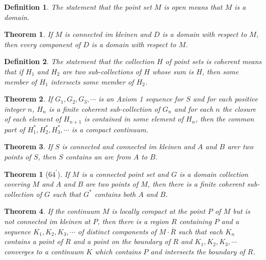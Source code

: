 \documentclass[10pt]{report}
\newtheorem{theorem}{Theorem}
\newtheorem*{theorem*}{Theorem}
\newtheorem{definition}{Definition}
\newcommand{\cl}[1]{\overline{#1}}
\begin{document}
\begin{definition}
 The statement that the point set $M$ is open means that $M$ is a domain.
\end{definition}

\begin{theorem}
 If $M$ is connected im kleinen and $D$ is a domain with respect to $M$, then every component of $D$ is a domain with
respect to $M$.
\end{theorem}

\begin{definition}
 The statement that the collection $H$ of point sets is coherent means that if $H_1$ and $H_2$ are two sub-collections
of $H$ whose sum is $H$, then some member of $H_1$ intersects some member of $H_2$.
\end{definition}

\begin{theorem}
 If $G_1,G_2,G_3,\cdots$ is an Axiom 1 sequence for $S$ and for each positive integer $n$, $H_n$ is a finite coherent
sub-collection of $G_n$ and for each $n$ the closure of each element of $H_{n+1}$ is contained in some element of
$H_n$, then the common part of $H_1^*,H_2^*,H_3^*,\cdots$ is a compact continuum.
\end{theorem}

\begin{theorem}
 If $S$ is connected and connected im kleinen and $A$ and $B$ arer two points of $S$, then $S$ contains an arc from $A$
to $B$.
\end{theorem}

\begin{theorem*}[$64^\prime$]
 If $M$ is a connected point set and $G$ is a domain collection covering $M$ and $A$ and $B$ are two points of $M$, then
there is a finite coherent sub-collection of $G$ such that $G^*$ contains both $A$ and $B$.
\end{theorem*}

\begin{theorem}
 If the continuum $M$ is locally compact at the point $P$ of $M$ but is not connected im kleinen at $P$, then there is a
region $R$ containing $P$ and a sequence $K_1,K_2,K_3,\cdots$ of distinct components of $M\cdot\cl{R}$ such that each
$K_n$ contains a point of $R$ and a point on the boundary of $R$ and $K_1,K_2,K_3,\cdots$ converges to a continuum $K$
which contains $P$ and intersects the boundary of $R$.
\end{theorem}
\end{document}
